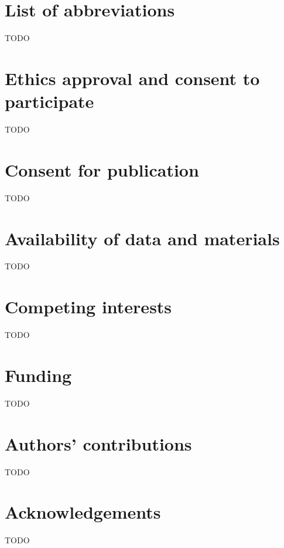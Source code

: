 \section{List of abbreviations}
TODO

\section{Ethics approval and consent to participate}
TODO

\section{Consent for publication}
TODO

\section{Availability of data and materials}
TODO

\section{Competing interests}
TODO

\section{Funding}
TODO

\section{Authors' contributions}
TODO

\section{Acknowledgements}
TODO

